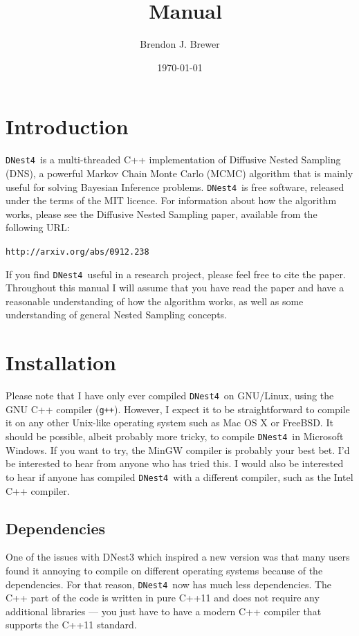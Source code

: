 \documentclass[a4paper, 11pt]{article}
\title{\dnest~Manual}
\author{Brendon J. Brewer}
\date{\today}
\newcommand{\dnest}{{\tt DNest4}}
\begin{document}
\maketitle

\section{Introduction}

\dnest~is a multi-threaded C++ implementation of Diffusive Nested Sampling
(DNS), a powerful Markov Chain Monte Carlo (MCMC) algorithm that is mainly
useful for solving Bayesian Inference problems.
\dnest~is free software, released under the terms of the MIT licence.
For information about how the
algorithm works, please see the Diffusive Nested Sampling paper,
available from the following URL:\\

\begin{center}
{\tt http://arxiv.org/abs/0912.238}\\
\end{center}

If you find \dnest~useful in a research project,
please feel free to cite the paper.
Throughout this manual I will assume that you have read the paper and have a
reasonable understanding of how the algorithm works, as well as some
understanding of general Nested Sampling concepts.\\

\section{Installation}
Please note that I have only ever compiled \dnest~on GNU/Linux,
using the GNU C++ compiler ({\tt g++}). However, I expect it to be
straightforward to compile it on any other Unix-like operating system such as Mac
OS X or FreeBSD. It should be possible, albeit probably more tricky,
to compile \dnest~in Microsoft Windows. If you want to try,
the MinGW compiler is
probably your best bet. I'd be interested to hear from anyone who
has tried this. I would also be interested to hear if anyone has
compiled \dnest~with a different compiler, such as the Intel C++
compiler.\\

\subsection{Dependencies}
One of the issues with DNest3 which inspired a new version was that many users
found it annoying to compile on different operating systems because of the
dependencies. For that reason, \dnest~now has much less dependencies.
The C++ part of the code is written in pure C++11 and does not require any
additional libraries --- you just have to have a modern C++ compiler that
supports the C++11 standard.
\end{document}
